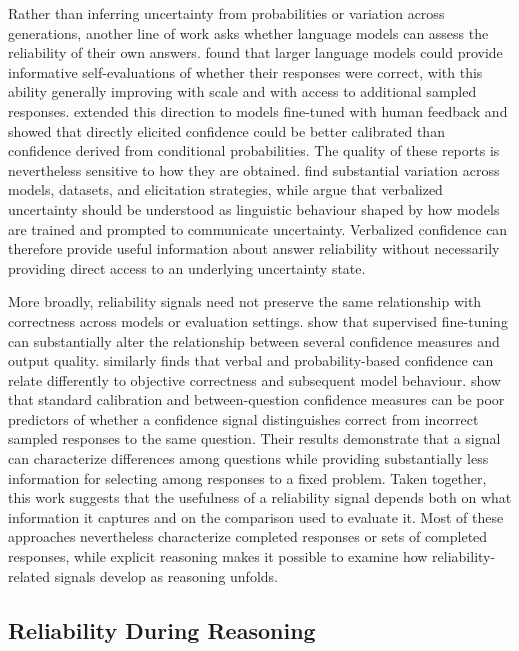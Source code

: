 \documentclass{article}
\begin{document}
Rather than inferring uncertainty from probabilities or variation across generations, another line of work asks whether language models can assess the reliability of their own answers. \citet{kadavath2022know} found that larger language models could provide informative self-evaluations of whether their responses were correct, with this ability generally improving with scale and with access to additional sampled responses. \citet{tian2023calibration} extended this direction to models fine-tuned with human feedback and showed that directly elicited confidence could be better calibrated than confidence derived from conditional probabilities. The quality of these reports is nevertheless sensitive to how they are obtained. \citet{yang2026verbalized} find substantial variation across models, datasets, and elicitation strategies, while \citet{ulmer2026anthropomimetic} argue that verbalized uncertainty should be understood as linguistic behaviour shaped by how models are trained and prompted to communicate uncertainty. Verbalized confidence can therefore provide useful information about answer reliability without necessarily providing direct access to an underlying uncertainty state.

More broadly, reliability signals need not preserve the same relationship with correctness across models or evaluation settings. \citet{flores2026confidence} show that supervised fine-tuning can substantially alter the relationship between several confidence measures and output quality. \citet{kumaran2026reported} similarly finds that verbal and probability-based confidence can relate differently to objective correctness and subsequent model behaviour. \citet{taubenfeld2025confidence} show that standard calibration and between-question confidence measures can be poor predictors of whether a confidence signal distinguishes correct from incorrect sampled responses to the same question. Their results demonstrate that a signal can characterize differences among questions while providing substantially less information for selecting among responses to a fixed problem. Taken together, this work suggests that the usefulness of a reliability signal depends both on what information it captures and on the comparison used to evaluate it. Most of these approaches nevertheless characterize completed responses or sets of completed responses, while explicit reasoning makes it possible to examine how reliability-related signals develop as reasoning unfolds.

\subsection{Reliability During Reasoning}
\end{document}
